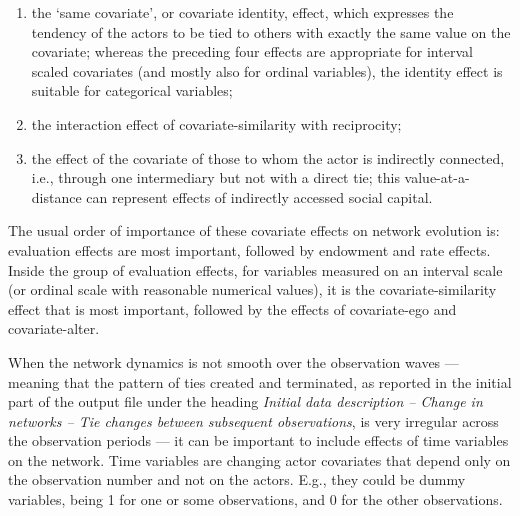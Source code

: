 \documentclass[a4paper,fleqn]{article}
\newcommand{\+}{\, + \,}
\begin{document}
{\begin{itemize}
\begin{enumerate}
      of ego and of the other actor (covariate ego $\times$ covariate alter);
      a positive effect here means, just like a positive similarity effect,
      that actors with a higher value on the covariate
      will prefer ties to others who likewise have a relatively high
      value;
      when used together with the alter effect of the squared variable
      this effect is quite analogous to the similarity effect,
      and for dichotomous covariates, in models where the ego and
      alter effects are also included, it even is equivalent
      to the similarity effect (although expressed differently),
      and then the squared alter effect is superfluous;
\item the `same covariate', or covariate identity, effect, which expresses the tendency of the
      actors to be tied to others with exactly the same value on the covariate;
      whereas the preceding four effects are appropriate for interval scaled
      covariates (and mostly also for ordinal variables),
      the identity effect is suitable for categorical variables;
\item the interaction effect of covariate-similarity with reciprocity;
\item the effect of the covariate of those to whom the actor is
      indirectly connected, i.e., through one intermediary but not
      with a direct tie; this value-at-a-distance can represent
      effects of indirectly accessed social capital.
\end{enumerate}
\end{itemize}
The usual order of importance of these covariate effects on
network evolution is: evaluation effects are most important, followed
by endowment and rate effects. Inside the group of evaluation
effects, for variables measured on an interval scale
(or ordinal scale with reasonable numerical values),
it is the covariate-similarity effect that is most
important, followed by the effects of covariate-ego and
covariate-alter.

When the network dynamics is not smooth over the observation waves --- meaning that
the pattern of ties created and terminated, as reported in the initial part of the output
file under the heading \emph{Initial data description -- Change in networks --
Tie changes between subsequent observations},
is very irregular across the observation periods --- it can be important to include
effects of time variables on the network.
Time variables are changing actor covariates that depend only on the
observation number and not on the actors. E.g., they could be dummy variables, being 1
for one or some observations, and 0 for the other observations.

}
\end{document}
